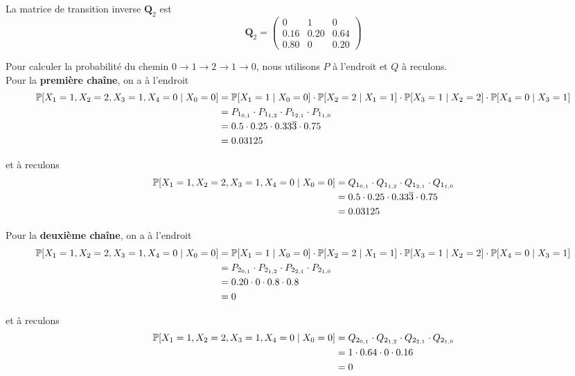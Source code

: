 \documentclass{article}
\begin{document}
La matrice de transition inverse $\boldsymbol{Q}_2$ est
\begin{equation}
    \boldsymbol{Q}_2=\begin{pmatrix}
        0 & 1 & 0 \\
        0.16 & 0.20 & 0.64 \\
        0.80 & 0 & 0.20
    \end{pmatrix}
\end{equation}

\vspace{.2cm}
Pour calculer la probabilité du chemin $0\to 1\to 2\to 1\to 0$, nous
utilisons $P$ à l'endroit et $Q$ à reculons. \\

Pour la \textbf{première chaîne}, on a à l'endroit
\begin{align}
    \mathbb{P}[X_1=1,X_2=2,X_3=1,X_4=0\mid X_0=0]&=\mathbb{P}[X_1=1\mid X_0=0]\cdot\mathbb{P}[X_2=2\mid X_1=1]\cdot\mathbb{P}[X_3=1\mid X_2=2]\cdot\mathbb{P}[X_4=0\mid X_3=1] \notag \\
    &=P_{1_{0,1}}\cdot P_{1_{1,2}}\cdot P_{1_{2,1}}\cdot P_{1_{1,0}} \notag \\
    &=0.5\cdot0.25\cdot0.33\overline{3}\cdot0.75 \notag \\
    &=0.03125 \notag
\end{align}

et à reculons
\begin{align}
    \mathbb{P}[X_1=1,X_2=2,X_3=1,X_4=0\mid X_0=0]&=Q_{1_{0,1}}\cdot Q_{1_{1,2}}\cdot Q_{1_{2,1}}\cdot Q_{1_{1,0}} \notag \\
    &=0.5\cdot0.25\cdot0.33\overline{3}\cdot0.75 \notag \\
    &=0.03125 \notag
\end{align}

Pour la \textbf{deuxième chaîne}, on a à l'endroit
\begin{align}
    \mathbb{P}[X_1=1,X_2=2,X_3=1,X_4=0\mid X_0=0]&=\mathbb{P}[X_1=1\mid X_0=0]\cdot\mathbb{P}[X_2=2\mid X_1=1]\cdot\mathbb{P}[X_3=1\mid X_2=2]\cdot\mathbb{P}[X_4=0\mid X_3=1] \notag \\
    &=P_{2_{0,1}}\cdot P_{2_{1,2}}\cdot P_{2_{2,1}}\cdot P_{2_{1,0}} \notag \\
    &=0.20\cdot0\cdot0.8\cdot0.8 \notag \\
    &=0 \notag
\end{align}

et à reculons
\begin{align}
    \mathbb{P}[X_1=1,X_2=2,X_3=1,X_4=0\mid X_0=0]&=Q_{2_{0,1}}\cdot Q_{2_{1,2}}\cdot Q_{2_{2,1}}\cdot Q_{2_{1,0}} \notag \\
    &=1\cdot0.64\cdot0\cdot0.16 \notag \\
    &=0 \notag
\end{align}
\end{document}
